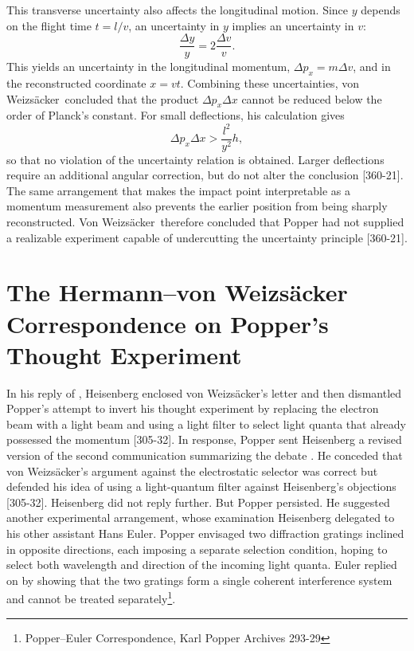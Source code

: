 \documentclass[pdflatex]{sn-jnl}
\newcommand{\TE}{thought experiment\xspace}
\newcommand{\vW}{von Weizsäcker\xspace}
\newcommand{\VW}{Von Weizsäcker\xspace}
\begin{document}
This transverse uncertainty also affects the longitudinal motion. Since $y$ depends on the flight time $t=l/v$, an uncertainty in $y$ implies an uncertainty in $v$:
\begin{equation*}
\frac{\Delta y}{y} = 2\frac{\Delta v}{v}.
\end{equation*}
%
This yields an uncertainty in the longitudinal momentum, $\Delta p_x=m\Delta v$, and in the reconstructed coordinate $x=vt$. Combining these uncertainties, \vW\ concluded that the product $\Delta p_x\Delta x$ cannot be reduced below the order of Planck's constant. For small deflections, his calculation gives
%
\begin{equation*}
\Delta p_x \Delta x > \frac{l^2}{y^2}h,
\end{equation*}
%
so that no violation of the uncertainty relation is obtained. Larger deflections require an additional angular correction, but do not alter the conclusion [360-21]. The same arrangement that makes the impact point interpretable as a momentum measurement also prevents the earlier position from being sharply reconstructed. \VW\ therefore concluded that Popper had not supplied a realizable experiment capable of undercutting the uncertainty principle [360-21].

\section{The Hermann--\vW Correspondence on Popper's Thought Experiment}
%
In his reply of , Heisenberg enclosed \vW's letter and then dismantled Popper's attempt to invert his \TE by replacing the electron beam with a light beam and using a light filter to select light quanta that already possessed the  momentum [305-32]. In response, Popper sent Heisenberg a revised version of the second communication summarizing the debate \citep{Popper1934c}. He conceded that \vW's argument against the electrostatic selector was correct but defended his idea of using a light-quantum filter against Heisenberg's objections [305-32]. Heisenberg did not reply further. But Popper persisted. He suggested another experimental arrangement, whose examination Heisenberg delegated to his other assistant Hans Euler. Popper envisaged two diffraction gratings inclined in opposite directions, each imposing a separate selection condition, hoping to select both wavelength and direction of the incoming light quanta. Euler replied on  by showing that the two gratings form a single coherent interference system and cannot be treated separately\footnote{Popper--Euler Correspondence, Karl Popper Archives 293-29}.
\end{document}
